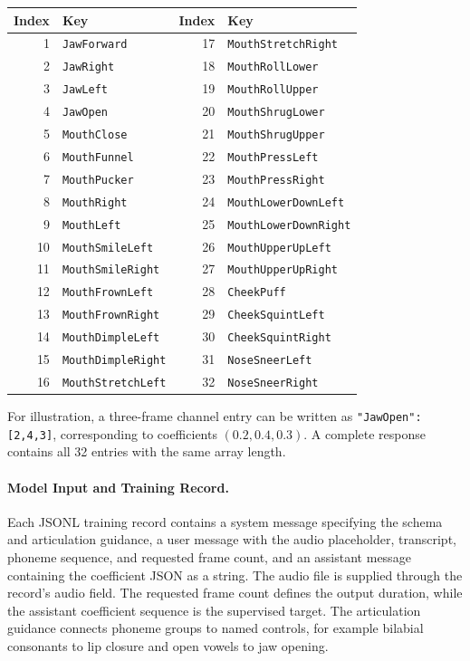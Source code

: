 \begin{center}
\small
\begin{tabular}{r l r l}
\hline
Index & Key & Index & Key \\
\hline
1 & \texttt{JawForward} & 17 & \texttt{MouthStretchRight} \\
2 & \texttt{JawRight} & 18 & \texttt{MouthRollLower} \\
3 & \texttt{JawLeft} & 19 & \texttt{MouthRollUpper} \\
4 & \texttt{JawOpen} & 20 & \texttt{MouthShrugLower} \\
5 & \texttt{MouthClose} & 21 & \texttt{MouthShrugUpper} \\
6 & \texttt{MouthFunnel} & 22 & \texttt{MouthPressLeft} \\
7 & \texttt{MouthPucker} & 23 & \texttt{MouthPressRight} \\
8 & \texttt{MouthRight} & 24 & \texttt{MouthLowerDownLeft} \\
9 & \texttt{MouthLeft} & 25 & \texttt{MouthLowerDownRight} \\
10 & \texttt{MouthSmileLeft} & 26 & \texttt{MouthUpperUpLeft} \\
11 & \texttt{MouthSmileRight} & 27 & \texttt{MouthUpperUpRight} \\
12 & \texttt{MouthFrownLeft} & 28 & \texttt{CheekPuff} \\
13 & \texttt{MouthFrownRight} & 29 & \texttt{CheekSquintLeft} \\
14 & \texttt{MouthDimpleLeft} & 30 & \texttt{CheekSquintRight} \\
15 & \texttt{MouthDimpleRight} & 31 & \texttt{NoseSneerLeft} \\
16 & \texttt{MouthStretchLeft} & 32 & \texttt{NoseSneerRight} \\
\hline
\end{tabular}
\end{center}

For illustration, a three-frame channel entry can be written as \texttt{"JawOpen":[2,4,3]}, corresponding to coefficients $(0.2,0.4,0.3)$. A complete response contains all 32 entries with the same array length.

\paragraph{Model Input and Training Record.}
Each JSONL training record contains a system message specifying the schema and articulation guidance, a user message with the audio placeholder, transcript, phoneme sequence, and requested frame count, and an assistant message containing the coefficient JSON as a string.
The audio file is supplied through the record's audio field.
The requested frame count defines the output duration, while the assistant coefficient sequence is the supervised target.
The articulation guidance connects phoneme groups to named controls, for example bilabial consonants to lip closure and open vowels to jaw opening.

